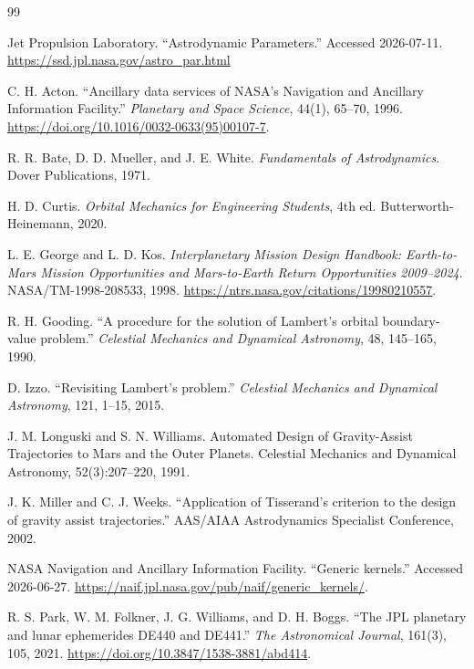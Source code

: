\documentclass[11pt,a4paper]{article}
\begin{document}
\clearpage
\begin{thebibliography}{99}
Jet Propulsion Laboratory. ``Astrodynamic Parameters.''
Accessed 2026-07-11. \url{https://ssd.jpl.nasa.gov/astro_par.html}

C. H. Acton. ``Ancillary data services of NASA's Navigation and Ancillary
Information Facility.'' \emph{Planetary and Space Science}, 44(1), 65--70,
1996. \url{https://doi.org/10.1016/0032-0633(95)00107-7}.

R. R. Bate, D. D. Mueller, and J. E. White.
\emph{Fundamentals of Astrodynamics}. Dover Publications, 1971.

H. D. Curtis. \emph{Orbital Mechanics for Engineering Students}, 4th ed.
Butterworth-Heinemann, 2020.

L. E. George and L. D. Kos. \emph{Interplanetary Mission Design Handbook:
Earth-to-Mars Mission Opportunities and Mars-to-Earth Return Opportunities
2009--2024}. NASA/TM-1998-208533, 1998.
\url{https://ntrs.nasa.gov/citations/19980210557}.

R. H. Gooding. ``A procedure for the solution of Lambert's orbital
boundary-value problem.'' \emph{Celestial Mechanics and Dynamical Astronomy},
48, 145--165, 1990.

D. Izzo. ``Revisiting Lambert's problem.'' \emph{Celestial Mechanics and
Dynamical Astronomy}, 121, 1--15, 2015.

 J. M. Longuski and S. N. Williams. Automated Design of Gravity-Assist Trajectories to Mars and the Outer Planets. Celestial Mechanics and Dynamical Astronomy, 52(3):207–220, 1991.

J. K. Miller and C. J. Weeks. ``Application of Tisserand's criterion to the
design of gravity assist trajectories.'' AAS/AIAA Astrodynamics Specialist
Conference, 2002.

NASA Navigation and Ancillary Information Facility. ``Generic kernels.''
Accessed 2026-06-27. \url{https://naif.jpl.nasa.gov/pub/naif/generic_kernels/}.

R. S. Park, W. M. Folkner, J. G. Williams, and D. H. Boggs. ``The JPL
planetary and lunar ephemerides DE440 and DE441.'' \emph{The Astronomical
Journal}, 161(3), 105, 2021. \url{https://doi.org/10.3847/1538-3881/abd414}.


\end{thebibliography}
\end{document}
